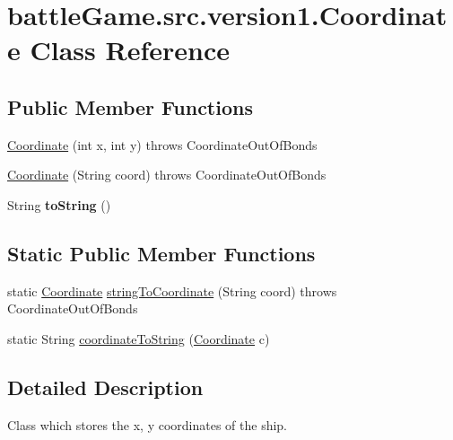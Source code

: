 \hypertarget{classbattleGame_1_1src_1_1version1_1_1Coordinate}{}\section{battle\+Game.\+src.\+version1.\+Coordinate Class Reference}
\label{classbattleGame_1_1src_1_1version1_1_1Coordinate}
\subsection*{Public Member Functions}
\begin{DoxyCompactItemize}
\item 
\hyperlink{classbattleGame_1_1src_1_1version1_1_1Coordinate_aff42e61da07a3171be8bd92f309807fd}{Coordinate} (int x, int y)  throws Coordinate\+Out\+Of\+Bonds 
\item 
\hyperlink{classbattleGame_1_1src_1_1version1_1_1Coordinate_ab6e6309158268ecbec967181e204ae70}{Coordinate} (String coord)  throws Coordinate\+Out\+Of\+Bonds
\item 
String {\bfseries to\+String} ()\hypertarget{classbattleGame_1_1src_1_1version1_1_1Coordinate_a5397580a6348b94b9bf0aada0a91ed10}{}\label{classbattleGame_1_1src_1_1version1_1_1Coordinate_a5397580a6348b94b9bf0aada0a91ed10}

\end{DoxyCompactItemize}
\subsection*{Static Public Member Functions}
\begin{DoxyCompactItemize}
\item 
static \hyperlink{classbattleGame_1_1src_1_1version1_1_1Coordinate}{Coordinate} \hyperlink{classbattleGame_1_1src_1_1version1_1_1Coordinate_ae2fd293f04b1b1d68d752ae99f283545}{string\+To\+Coordinate} (String coord)  throws Coordinate\+Out\+Of\+Bonds
\item 
static String \hyperlink{classbattleGame_1_1src_1_1version1_1_1Coordinate_a640a299172c04f936ed0e7b7b4ba52c5}{coordinate\+To\+String} (\hyperlink{classbattleGame_1_1src_1_1version1_1_1Coordinate}{Coordinate} c)
\end{DoxyCompactItemize}


\subsection{Detailed Description}
Class which stores the x, y coordinates of the ship. 

